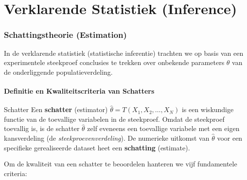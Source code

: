 \documentclass[11pt,a4paper]{article}
\begin{document}
\part{Verklarende Statistiek (Inference)}

\section{Schattingstheorie (Estimation)}

In de verklarende statistiek (statistische inferentie) trachten we op basis van een experimentele steekproef conclusies te trekken over onbekende parameters $\theta$ van de onderliggende populatieverdeling.

\subsection{Definitie en Kwaliteitscriteria van Schatters}
\begin{defbox}{Schatter}
Een \textbf{schatter} (estimator) $\hat{\theta} = T(X_1, X_2, \ldots, X_N)$ is een wiskundige functie van de toevallige variabelen in de steekproef. Omdat de steekproef toevallig is, is de schatter $\hat{\theta}$ zelf eveneens een toevallige variabele met een eigen kansverdeling (de \emph{steekproevenverdeling}). De numerieke uitkomst van $\hat{\theta}$ voor een specifieke gerealiseerde dataset heet een \textbf{schatting} (estimate).
\end{defbox}

Om de kwaliteit van een schatter te beoordelen hanteren we vijf fundamentele criteria:
\end{document}
